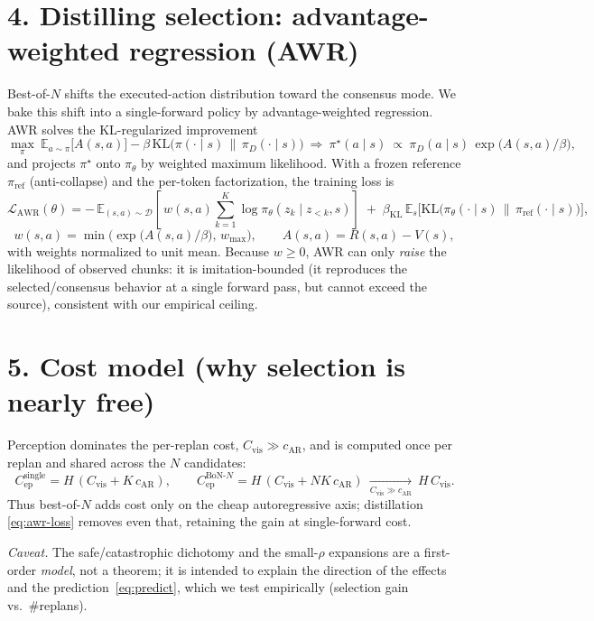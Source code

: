 \documentclass[11pt]{article}
\newcommand{\E}{\mathbb{E}}
\newcommand{\KL}{\mathrm{KL}}
\newcommand{\R}{R}
\begin{document}
\section*{4. Distilling selection: advantage-weighted regression (AWR)}
Best-of-$N$ shifts the executed-action distribution toward the consensus mode. We bake this
shift into a single-forward policy by advantage-weighted regression. AWR solves the
KL-regularized improvement
\begin{equation}
  \max_{\pi}\ \E_{a\sim\pi}\!\big[A(s,a)\big]-\beta\,\KL\!\big(\pi(\cdot\mid s)\,\|\,\pi_{\!D}(\cdot\mid s)\big)
  \ \Longrightarrow\
  \pi^\star(a\mid s)\ \propto\ \pi_{\!D}(a\mid s)\,\exp\!\big(A(s,a)/\beta\big),
  \label{eq:awr-sol}
\end{equation}
and projects $\pi^\star$ onto $\pi_\theta$ by weighted maximum likelihood. With a frozen
reference $\pi_{\text{ref}}$ (anti-collapse) and the per-token factorization, the training loss is
\begin{equation}
  \mathcal{L}_{\text{AWR}}(\theta)
  = -\,\E_{(s,a)\sim\mathcal{D}}
     \!\left[\, w(s,a)\sum_{k=1}^{K}\log\pi_\theta(z_k\mid z_{<k},s)\right]
   \;+\;\beta_{\KL}\,\E_{s}\!\big[\KL\!\big(\pi_\theta(\cdot\mid s)\,\|\,\pi_{\text{ref}}(\cdot\mid s)\big)\big],
  \label{eq:awr-loss}
\end{equation}
\begin{equation}
  w(s,a)=\min\!\Big(\exp\!\big(A(s,a)/\beta\big),\,w_{\max}\Big),\qquad
  A(s,a)=\R(s,a)-V(s),
  \label{eq:awr-weight}
\end{equation}
with weights normalized to unit mean. Because $w\ge 0$, AWR can only \emph{raise} the likelihood
of observed chunks: it is imitation-bounded (it reproduces the selected/consensus behavior at a
single forward pass, but cannot exceed the source), consistent with our empirical ceiling.

\section*{5. Cost model (why selection is nearly free)}
Perception dominates the per-replan cost, $C_{\text{vis}}\gg c_{\text{AR}}$, and is computed once
per replan and shared across the $N$ candidates:
\begin{equation}
  C_{\text{ep}}^{\text{single}} = H\,(C_{\text{vis}}+K\,c_{\text{AR}}),\qquad
  C_{\text{ep}}^{\text{BoN-}N} = H\,(C_{\text{vis}}+N K\,c_{\text{AR}})
  \ \xrightarrow[C_{\text{vis}}\gg c_{\text{AR}}]{}\ H\,C_{\text{vis}} .
  \label{eq:cost}
\end{equation}
Thus best-of-$N$ adds cost only on the cheap autoregressive axis; distillation
\eqref{eq:awr-loss} removes even that, retaining the gain at single-forward cost.

\bigskip
\noindent\textit{Caveat.} The safe/catastrophic dichotomy and the small-$\rho$ expansions are a
first-order \emph{model}, not a theorem; it is intended to explain the direction of the effects
and the prediction~\eqref{eq:predict}, which we test empirically (selection gain vs.\ \#replans).
\end{document}

